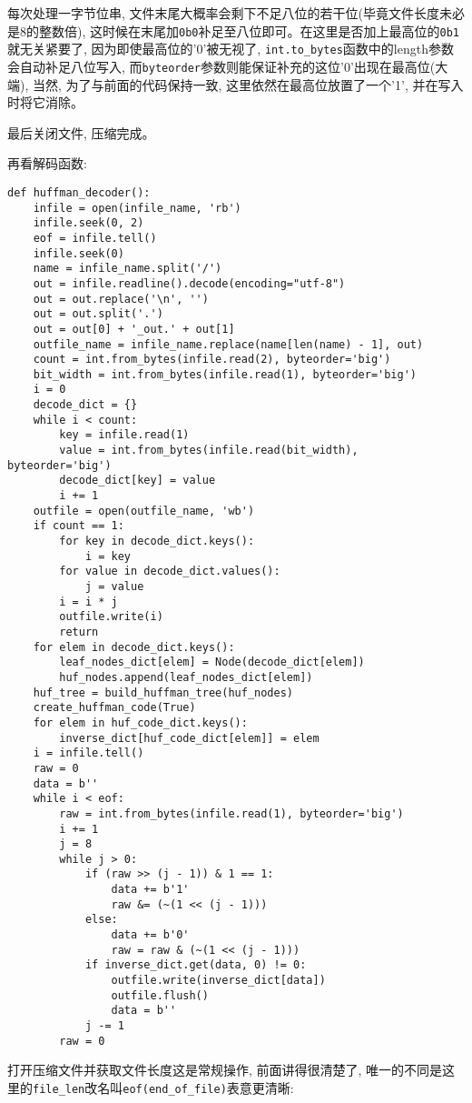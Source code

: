 \documentclass[a4paper]{ctexart}
\begin{document}
每次处理一字节位串, 文件末尾大概率会剩下不足八位的若干位(毕竟文件长度未必是8的整数倍), 这时候在末尾加\texttt{0b0}补足至八位即可。在这里是否加上最高位的\texttt{0b1}就无关紧要了, 因为即使最高位的'0'被无视了, \texttt{int.to\_bytes}函数中的length参数会自动补足八位写入, 而\texttt{byteorder}参数则能保证补充的这位'0'出现在最高位(大端), 当然, 为了与前面的代码保持一致, 这里依然在最高位放置了一个'1', 并在写入时将它消除。

最后关闭文件, 压缩完成。

再看解码函数:

{\setmainfont{Courier New Bold}              
\begin{lstlisting}
def huffman_decoder():
    infile = open(infile_name, 'rb')
    infile.seek(0, 2)
    eof = infile.tell()
    infile.seek(0)
    name = infile_name.split('/')
    out = infile.readline().decode(encoding="utf-8")
    out = out.replace('\n', '')
    out = out.split('.')
    out = out[0] + '_out.' + out[1]
    outfile_name = infile_name.replace(name[len(name) - 1], out)
    count = int.from_bytes(infile.read(2), byteorder='big')
    bit_width = int.from_bytes(infile.read(1), byteorder='big')
    i = 0
    decode_dict = {}
    while i < count:
        key = infile.read(1)
        value = int.from_bytes(infile.read(bit_width), byteorder='big')
        decode_dict[key] = value
        i += 1
    outfile = open(outfile_name, 'wb')
    if count == 1:
        for key in decode_dict.keys():
            i = key
        for value in decode_dict.values():
            j = value
        i = i * j
        outfile.write(i)
        return
    for elem in decode_dict.keys():
        leaf_nodes_dict[elem] = Node(decode_dict[elem])
        huf_nodes.append(leaf_nodes_dict[elem])
    huf_tree = build_huffman_tree(huf_nodes)
    create_huffman_code(True)
    for elem in huf_code_dict.keys():
        inverse_dict[huf_code_dict[elem]] = elem
    i = infile.tell()
    raw = 0
    data = b''
    while i < eof:
        raw = int.from_bytes(infile.read(1), byteorder='big')
        i += 1
        j = 8
        while j > 0:
            if (raw >> (j - 1)) & 1 == 1:
                data += b'1'
                raw &= (~(1 << (j - 1)))
            else:
                data += b'0'
                raw = raw & (~(1 << (j - 1)))
            if inverse_dict.get(data, 0) != 0:
                outfile.write(inverse_dict[data])
                outfile.flush()
                data = b''
            j -= 1
        raw = 0
\end{lstlisting}}

打开压缩文件并获取文件长度这是常规操作, 前面讲得很清楚了, 唯一的不同是这里的\texttt{file\_len}改名叫\texttt{eof(end\_of\_file)}表意更清晰:
\end{document}
